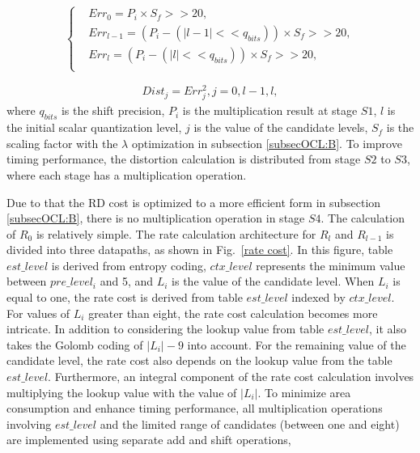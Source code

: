 \documentclass[lettersize,journal]{IEEEtran}
\begin{document}
\begin{equation}\label{err}
	\left\{
		\begin{aligned}
			&Err_{0} 	=  P_{i} \times S_f >> 20,  \\
			&Err_{l-1} 	= \left ( P_{i} - \left ( \lvert l-1 \rvert << q_{bits} \right ) \right ) \times S_f >> 20,  \\
			&Err_{l} 	= \left ( P_{i} - \left ( \lvert l \rvert << q_{bits} \right ) \right ) \times S_f >> 20,  \\ 
		\end{aligned}
	\right.
\end{equation}

\begin{equation}\label{distortion}
	\begin{aligned}
		Dist_{j} = Err_{j}^{2}, j = 0, l-1, l,
	\end{aligned}
\end{equation}
where $q_{bits}$ is the shift precision, $P_{i}$ is the multiplication result at stage $S1$, $l$ is the initial scalar quantization level, $j$ is the value of the candidate levels, $S_f$ is the scaling factor with the $\lambda$ optimization in subsection \ref{subsecOCL:B}. To improve timing performance, the distortion calculation is distributed from stage $S2$ to $S3$, where each stage has a multiplication operation. 

Due to that the RD cost is optimized to a more efficient form in subsection \ref{subsecOCL:B}, there is no multiplication operation in stage $S4$. The calculation of $R_{0}$ is relatively simple. The rate calculation architecture for $R_{l}$ and $R_{l-1}$ is divided into three datapaths, as shown in Fig.~\ref{rate cost}. 
In this figure, table $est\_level$ is derived from entropy coding, $ctx\_level$ represents the minimum value between $pre\_level_i$ and 5, and $L_i$ is the value of the candidate level. 
When $L_i$ is equal to one, the rate cost is derived from table $est\_level$ indexed by $ctx\_level$. 
For values of $L_i$ greater than eight, the rate cost calculation becomes more intricate. 
In addition to considering the lookup value from table $est\_level$, it also takes the Golomb coding of $\vert L_{i}\vert -9$ into account. 
For the remaining value of the candidate level, the rate cost also depends on the lookup value from the table $est\_level$. Furthermore, an integral component of the rate cost calculation involves multiplying the lookup value with the value of $\vert L_i\vert$. To minimize area consumption and enhance timing performance, all multiplication operations involving $est\_level$ and the limited range of candidates (between one and eight) are implemented using separate add and shift operations, 
\end{document}
